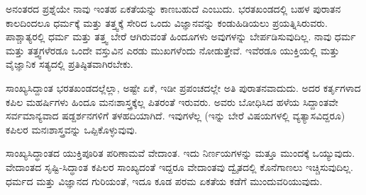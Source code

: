 ಅನಂತರದ ಪ್ರಶ್ನೆಯೇ ನಾವು ಇಂತಹ ಏಕತೆಯನ್ನು ಕಾಣಬಹುದೆ ಎಂಬುದು. ಭರತಖಂಡದಲ್ಲಿ ಬಹಳ ಪುರಾತನ ಕಾಲದಿಂದಲೂ ಧರ್ಮಕ್ಕೆ ಮತ್ತು ತತ್ತ್ವಕ್ಕೆ ಸೇರಿದ ಒಂದು ವಿಜ್ಞಾನವನ್ನು ಕಂಡುಹಿಡಿಯಲು ಪ್ರಯತ್ನಿಸಿರುವರು. ಪಾಶ್ಚಾತ್ಯರಲ್ಲಿ ಧರ್ಮ ಮತ್ತು ತತ್ತ್ವ ಬೇರೆ ಆಗಿರುವಂತೆ ಹಿಂದೂಗಳು ಅವುಗಳನ್ನು ಬೇರ್ಪಡಿಸುವುದಿಲ್ಲ. ನಾವು ಧರ್ಮ ಮತ್ತು ತತ್ತ್ವಗಳೆರಡೂ ಒಂದೇ ವಸ್ತುವಿನ ಎರಡು ಮುಖಗಳೆಂದು ನೋಡುತ್ತೇವೆ. ಇವೆರಡೂ ಯುಕ್ತಿಯಲ್ಲಿ ಮತ್ತು ವೈಜ್ಞಾನಿಕ ಸತ್ಯದಲ್ಲಿ ಪ್ರತಿಷ್ಠಿತವಾಗಿರಬೇಕು.

ಸಾಂಖ್ಯಸಿದ್ದಾಂತ ಭರತಖಂಡದಲ್ಲೆಲ್ಲಾ, ಅಷ್ಟೇ ಏಕೆ, ಇಡೀ ಪ್ರಪಂಚದಲ್ಲೇ ಅತಿ ಪುರಾತನವಾದುದು. ಅದರ ಕರ್ತೃಗಳಾದ ಕಪಿಲ ಮಹರ್ಷಿಗಳು ಹಿಂದೂ ಮನಃಶಾಸ್ತ್ರಕ್ಕೆಲ್ಲ ಪಿತರಂತೆ ಇರುವರು. ಅವರು ಬೋಧಿಸಿದ ಹಳೆಯ ಸಿದ್ದಾಂತವೇ ಸರ್ವಮಾನ್ಯವಾದ ಷಡ್ದರ್ಶನಗಳಿಗೆ ತಳಹದಿಯಾಗಿದೆ. ಇವುಗಳೆಲ್ಲ (ಇನ್ನು ಬೇರೆ ವಿಷಯಗಳಲ್ಲಿ ವ್ಯತ್ಯಾಸವಿದ್ದರೂ) ಕಪಿಲರ ಮನಃಶಾಸ್ತ್ರವನ್ನು ಒಪ್ಪಿಕೊಳ್ಳುವುವು.

ಸಾಂಖ್ಯಸಿದ್ಧಾಂತದ ಯುಕ್ತಿಪೂರಿತ ಪರಿಣಾಮವೆ ವೇದಾಂತ. ಇದು ನಿರ್ಣಯಗಳನ್ನು ಮತ್ತೂ ಮುಂದಕ್ಕೆ ಒಯ್ಯುವುದು. ವೇದಾಂತದ ಸೃಷ್ಟಿ-ಸಿದ್ಧಾಂತ  ಕಪಿಲರ ಸಾಂಖ್ಯದಂತೆ ಇದ್ದರೂ ವೇದಾಂತವು ದ್ವೈತದಲ್ಲಿ ಕೊನೆಗಾಣಲು ಇಚ್ಚಿಸುವುದಿಲ್ಲ. ಧರ್ಮದ ಮತ್ತು ವಿಜ್ಞಾನದ ಗುರಿಯಂತೆ, ಇದೂ ಕೂಡ ಪರಮ ಏಕತೆಯ ಕಡೆಗೆ ಮುಂದುವರಿಯುವುದು.

